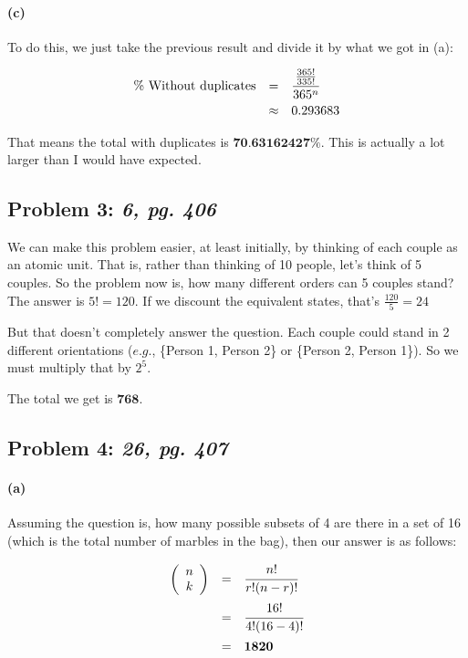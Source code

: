 \documentclass[a4paper]{article}
\begin{document}
\paragraph{(c)} To do this, we just take the previous result and divide it by what we got in (a):

\begin{equation}
\begin{array}{rll}
\mbox{\% Without duplicates} & = & \cfrac{\frac{365!}{335!}}{365^n} \\[.1in]
& \approx & 0.293683\\
\end{array}
\end{equation}

That means the total with duplicates is $\textbf{70.63162427\%}$. This is actually a lot larger than I would have expected.

\subsection*{Problem 3: \textit{6, pg. 406}} We can make this problem easier, at least initially, by thinking of each couple as an atomic unit. That is, rather than thinking of 10 people, let's think of 5 couples. So the problem now is, how many different orders can 5 couples stand? The answer is $5! = 120$. If we discount the equivalent states, that's $\frac{120}{5} = 24$

But that doesn't completely answer the question. Each couple could stand in 2 different orientations ($\textit{e.g.}$, \{Person 1, Person 2\} or \{Person 2, Person 1\}). So we must multiply that by $2^5$.

The total we get is $\textbf{768}$.

\subsection*{Problem 4: \textit{26, pg. 407}}

\paragraph{(a)} Assuming the question is, how many possible subsets of 4 are there in a set of 16 (which is the total number of marbles in the bag), then our answer is as follows:

\begin{equation}
\begin{array}{rll}
\left ( \begin{array}{c} n \\ k \end{array} \right ) & = & \cfrac{n!}{r!(n-r)!} \\[.15in]
& = & \cfrac{16!}{4!(16-4)!} \\[.15in]
& = & \mathbf{1820} \\[.15in]
\end{array}
\end{equation}
\end{document}
